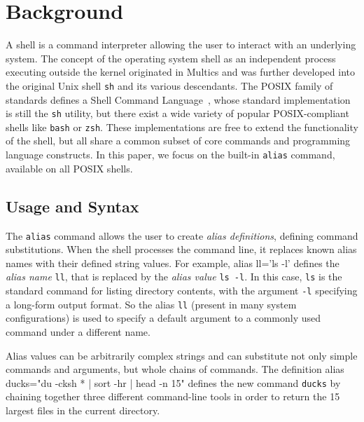 \documentclass[smallextended,natbib]{svjour3}
\newcommand*{\TODO}{\textcolor{red}{TODO}\xspace}
\newenvironment{CVerbatim}
  {\center\BVerbatim}
  {\endBVerbatim\endcenter}
\newcommand{\cmd}[1]{{\texttt{#1}}}
\begin{document}
\section{Background}

A shell is a command interpreter allowing the user to interact with an underlying system.
The concept of the operating system shell as an independent process executing outside the kernel originated in Multics and was further developed into the original Unix shell \texttt{sh} and its various descendants.
The POSIX family of standards defines a Shell Command Language~\citep{posix_standard, greenberg:17}, whose standard implementation is still the \texttt{sh} utility, but there exist a wide variety of popular POSIX-compliant shells like \texttt{bash} or \texttt{zsh}.
These implementations are free to extend the functionality of the shell, but all share a common subset of core commands and programming language constructs.
In this paper, we focus on the built-in \texttt{alias} command, available on all POSIX shells.

\subsection{Usage and Syntax}

The \texttt{alias} command allows the user to create \emph{alias definitions}, defining command substitutions.
When the shell processes the command line, it replaces known alias names with their defined string values.
For example, 
\begin{CVerbatim}
alias ll='ls -l'
\end{CVerbatim}
defines the \emph{alias name} \texttt{ll}, that is replaced by the \emph{alias value} \texttt{ls -l}.
In this case, \cmd{ls} is the standard command for listing directory contents, with the argument \texttt{-l} specifying a long-form output format.
So the alias \texttt{ll} (present in many system configurations) is used to specify a default argument to a commonly used command under a different name.

Alias values can be arbitrarily complex strings and can substitute not only simple commands and arguments, but whole chains of commands. 
The definition
\begin{CVerbatim}
alias ducks="du -cksh * | sort -hr | head -n 15"
\end{CVerbatim}
defines the new command \cmd{ducks} by chaining together three different command-line tools in order to return the 15 largest files in the current directory.
\end{document}
